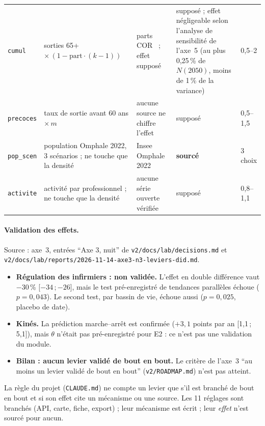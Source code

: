 \begin{small}
\begin{longtable}{@{}p{}p{}p{}p{}p{}@{}}
\texttt{cumul} & sorties 65+ $\times\,(1-\text{part}\cdot(k-1))$ & parts COR~\citep{e-cor2016} ; effet supposé & supposé ; effet négligeable selon l'analyse de sensibilité de l'axe~5 (au plus 0,25\mesure{}\,\% de $N(2050)$, moins de 1\mesure{}\,\% de la variance) & 0,5--2\mesure{} \\
\texttt{precoces} & taux de sortie avant 60 ans $\times\,m$ & aucune source ne chiffre l'effet & supposé & 0,5--1,5\mesure{} \\
\texttt{pop\_\allowbreak{}scen} & population Omphale 2022, 3\mesure{} scénarios ; ne touche que la densité & Insee Omphale 2022 & \textbf{sourcé} & 3\mesure{} choix \\
\texttt{activite} & activité par professionnel ; ne touche que la densité & aucune série ouverte vérifiée & supposé & 0,8--1,1\mesure{} \\
\end{longtable}
\end{small}

\paragraph{Validation des effets.}
Source : axe~3, entrées \enquote{Axe 3, nuit} de \texttt{v2/\allowbreak{}docs/\allowbreak{}lab/\allowbreak{}decisions.md} et \texttt{v2/\allowbreak{}docs/\allowbreak{}lab/\allowbreak{}reports/\allowbreak{}2026-\allowbreak{}11-\allowbreak{}14-\allowbreak{}axe3-\allowbreak{}n3-\allowbreak{}leviers-\allowbreak{}did.md}.
\begin{itemize}
\item \textbf{Régulation des infirmiers : non validée.} L'effet en double différence vaut $-30$\mesure{}\,\% [$-34$\,;\,$-26$]\mesure{}, mais le test pré-enregistré de tendances parallèles échoue ($p=0{,}043$\mesure{}). Le second test, par bassin de vie, échoue aussi ($p=0{,}025$\mesure{}, placebo de date).
\item \textbf{Kinés.} La prédiction marche--arrêt est confirmée ($+3{,}1$\mesure{} points par an [1,1\,;\,5,1]\mesure{}), mais $\theta$ n'était pas pré-enregistré pour E2 : ce n'est pas une validation du module.
\item \textbf{Bilan : aucun levier validé de bout en bout.} Le critère de l'axe~3 \enquote{au moins un levier validé de bout en bout} (\texttt{v2/\allowbreak{}ROADMAP.md}) n'est pas atteint.
\end{itemize}
La règle du projet (\texttt{CLAUDE.md}) ne compte un levier que s'il est branché de bout en bout et si son effet cite un mécanisme ou une source.
Les 11\mesure{} réglages sont branchés (API, carte, fiche, export) ; leur mécanisme est écrit ; leur \emph{effet} n'est sourcé pour aucun\derive{}.

